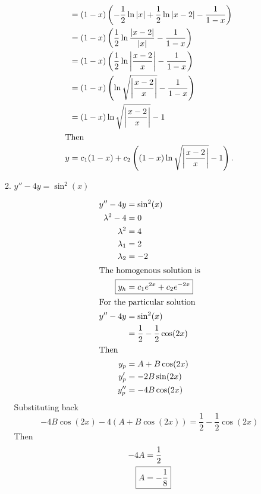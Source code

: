 \documentclass{zc-ust-hw}
\begin{document}
\begin{enumerate}
\begin{enumerate}
\begin{sol}
\begin{align}
              &= (1-x) \left( -\frac{1}{2}\ln|x|+\frac{1}{2}\ln |x-2| - \frac{1}{1-x} \right) \\
              &= (1-x) \left( \frac{1}{2}\ln\frac{|x-2|}{|x|} - \frac{1}{1-x} \right) \\
              &= (1-x) \left( \frac{1}{2}\ln\left|\frac{x-2}{x}\right| - \frac{1}{1-x} \right) \\
              &= (1-x) \left( \ln \sqrt{\left|\frac{x-2}{x}\right|} - \frac{1}{1-x} \right) \\
              &= (1-x)\ln\sqrt{\left|\frac{x-2}{x}\right|} - 1 \\
              \intertext{Then}
              y &= c_{1}(1-x)+c_{2}\left( (1-x)\ln\sqrt{\left|\frac{x-2}{x}\right|} - 1 \right)
            .\end{align}
          \end{sol}
        \item \( y''-4y=\sin^2(x) \)
          \begin{sol}
            \begin{align}
              y''-4y&=\sin^2(x) \\
              \lambda^2-4&=0 \\
              \lambda^2&=4 \\
              \lambda_{1}&=2 \\
              \lambda_{2}&=-2 \\
              \intertext{The homogenous solution is}
              \Aboxed{ y_{h}&=c_{1}e^{2x}+c_{2}e^{-2x} } \\
              \intertext{For the particular solution}
              y''-4y&=\sin^2(x) \\
              &= \frac{1}{2}-\frac{1}{2}\cos(2x) \\
              \intertext{Then}
              y_{p}&=A+B\cos(2x) \\
              y_{p}'&=-2B\sin(2x) \\
              y_{p}''&=-4B\cos(2x) \\
            \end{align}
            Substituting back
            \begin{equation}
              -4B\cos(2x)-4(A+B\cos(2x))=\frac{1}{2}-\frac{1}{2}\cos(2x)
            \end{equation}
            Then
            \begin{align}
              -4A&=\frac{1}{2} \\
              \Aboxed{A&=-\frac{1}{8}} \\

\end{align}
\end{sol}
\end{enumerate}
\end{enumerate}
\end{document}
